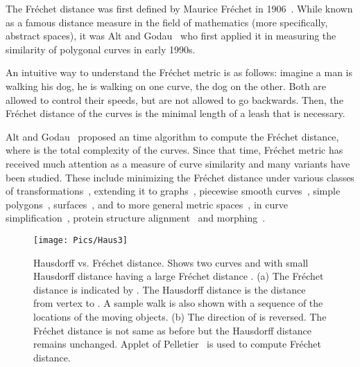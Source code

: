 \documentclass[12pt]{dalthesis}
\newcommand{\Frechet}{Fr\'echet }
\begin{document}
The \Frechet distance was first defined by Maurice \Frechet in 1906~\cite{FirstFD}. 
While known as a famous distance measure in the field of mathematics 
(more specifically, abstract spaces), 
it was Alt and Godau~\cite{AltG95} who first applied it in measuring the similarity of polygonal curves in early 1990s. 

An intuitive way to understand the \Frechet metric is as follows:
imagine a man is walking his
dog, he is walking on one curve, the dog on the other. Both are allowed to
control their speeds, but are not allowed to go backwards. Then, the \Frechet
distance of the curves is the minimal length of a leash that is necessary.







Alt and Godau~\cite{AltG95} proposed an  time 
algorithm to compute the \Frechet distance, 
where  is the total complexity of the curves. 
Since that time,
\Frechet metric has received much attention as a measure
of curve similarity and many variants have been studied. These include 
minimizing the \Frechet distance under various classes of transformations~\cite{AltTranslation,Mosig2005}, 
extending it to graphs~\cite{AltERW03a,VehicleTracking}, piecewise smooth curves~\cite{smoothFD}, simple polygons~\cite{Buchin2006}, surfaces~\cite{Alt2009Surface}, and
to more general metric spaces~\cite{WenkC08a,Chambers10,Cook2009},
in curve simplification~\cite{Agarwal2002}, 
protein structure alignment~\cite{JiangXZ08,FDRevisited} and morphing~\cite{GuibasNoCross}. 

















\begin{figure}[h]
	\centering
	\texttt{[image: Pics/Haus3]}
	\caption{ Hausdorff vs. \Frechet distance. Shows two curves  and  with small Hausdorff distance  having a large \Frechet distance .
	(a) The \Frechet distance is indicated by . The Hausdorff distance is the distance from vertex  to . A sample walk is also shown with
a sequence of the locations of the moving objects.
(b) The direction of  is reversed. The \Frechet distance is not same as before but the Hausdorff distance remains unchanged.
Applet of Pelletier~\cite{FDApplet} is used to compute \Frechet distance.
	}
	\label{fig:Haus}
\end{figure}
\end{document}
